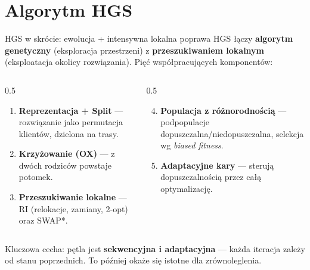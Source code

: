 \documentclass[aspectratio=169,11pt]{beamer}
\begin{document}
\section{Algorytm HGS}
\begin{frame}{HGS w skrócie: ewolucja + intensywna lokalna poprawa}
  HGS łączy \textbf{algorytm genetyczny} (eksploracja przestrzeni) z \textbf{przeszukiwaniem lokalnym} (eksploatacja okolicy rozwiązania). Pięć współpracujących komponentów:
  \vfill
  \begin{columns}[T]
    \begin{column}{0.5\textwidth}
      \begin{enumerate}
        \item \textbf{Reprezentacja + Split} — rozwiązanie jako permutacja klientów, dzielona na trasy.
        \item \textbf{Krzyżowanie (OX)} — z dwóch rodziców powstaje potomek.
        \item \textbf{Przeszukiwanie lokalne} — RI (relokacje, zamiany, 2-opt) oraz SWAP*.
      \end{enumerate}
    \end{column}
    \begin{column}{0.5\textwidth}
      \begin{enumerate}
        \setcounter{enumi}{3}
        \item \textbf{Populacja z różnorodnością} — podpopulacje dopuszczalna/niedopuszczalna, selekcja wg \emph{biased fitness}.
        \item \textbf{Adaptacyjne kary} — sterują dopuszczalnością przez całą optymalizację.
      \end{enumerate}
    \end{column}
  \end{columns}
  \vfill
  {\footnotesize Kluczowa cecha: pętla jest \textbf{sekwencyjna i adaptacyjna} — każda iteracja zależy od stanu poprzednich. To później okaże się istotne dla zrównoleglenia.}
\end{frame}
\end{document}
